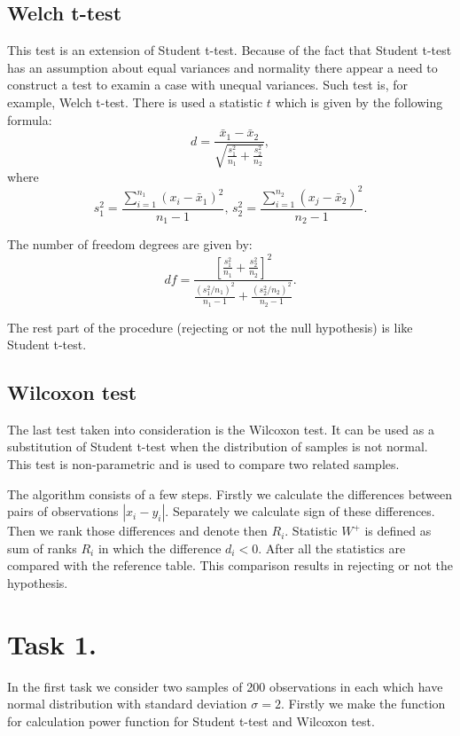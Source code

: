 \documentclass{article}
\begin{document}
  \subsection{Welch t-test}
This test is an extension of Student t-test. Because of the fact that Student t-test has an assumption about equal variances and normality there appear a need to construct a test to examin a case with unequal variances. Such test is, for example, Welch t-test. There is used a statistic $t$ which is given by the following formula:
  \begin{equation}
     d=\dfrac{\bar{x}_1-\bar{x}_2}{\sqrt{\frac{s_1^2}{n_1}+\frac{s_2^2}{n_2}}},
  \end{equation}
where 
  \begin{equation}
     s_1^2=\dfrac{\sum\limits_{i=1}^{n_1}(x_i-\bar{x}_1)^2}{n_1-1},\, s_2^2=\dfrac{\sum\limits_{i=1}^{n_2}(x_j-\bar{x}_2)^2}{n_2-1}.
  \end{equation}

The number of freedom degrees are given by:
  \begin{equation}
     df=\dfrac{\left[\frac{s_1^2}{n_1}+\frac{s_2^2}{n_2}\right]^2}{\frac{(s_1^2/n_1)^2}{n_1-1}+\frac{(s_2^2/n_2)^2}{n_2-1}}.
  \end{equation}
  
The rest part of the procedure (rejecting or not the null hypothesis) is like Student t-test.

  \subsection{Wilcoxon test}
The last test taken into consideration is the Wilcoxon test. It can be used as a substitution of Student t-test when the distribution of samples is not normal. This test is non-parametric and is used to compare two related samples.

  The algorithm consists of a few steps. Firstly we calculate the differences between pairs of observations $|x_i-y_i|$. Separately we calculate sign of these differences. Then we rank those differences and denote then $R_i$. Statistic $W^+$ is defined as sum of ranks $R_i$ in which the difference $d_i<0$. After all the statistics are compared with the reference table. This comparison results in rejecting or not the hypothesis.


  \section{Task 1.}
In the first task we consider two samples of 200 observations in each which have normal distribution with standard deviation $\sigma=2$.
  Firstly we make the function for calculation power function for Student t-test and Wilcoxon test.
 
\end{document}
